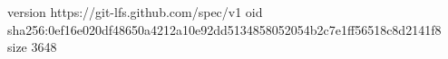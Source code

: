 version https://git-lfs.github.com/spec/v1
oid sha256:0ef16e020df48650a4212a10e92dd5134858052054b2c7e1ff56518c8d2141f8
size 3648
